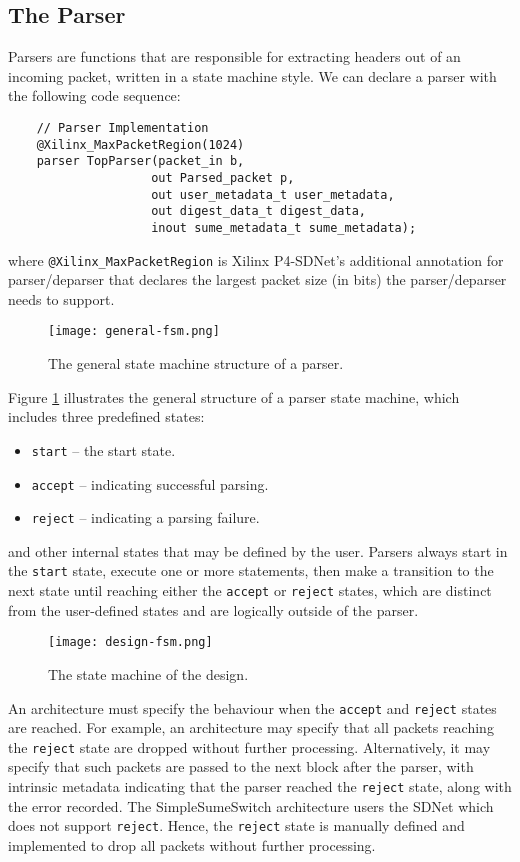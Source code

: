 	\subsection{The Parser}
Parsers are functions that are responsible for extracting headers out of an incoming packet, written in a state machine style. We can declare a parser with the following code sequence:

{\renewcommand{\baselinestretch}{0.8}\small
	\begin{verbatim}
    // Parser Implementation
    @Xilinx_MaxPacketRegion(1024)
    parser TopParser(packet_in b, 
                    out Parsed_packet p, 
                    out user_metadata_t user_metadata,
                    out digest_data_t digest_data,
                    inout sume_metadata_t sume_metadata);
	\end{verbatim}
}
where \texttt{@Xilinx\_MaxPacketRegion} is Xilinx P4-SDNet's additional annotation for parser/deparser that declares the largest packet size (in bits) the parser/deparser needs to support.

\begin{figure}[h]
	\centering
	\texttt{[image: general-fsm.png]}
	\caption{The general state machine structure of a parser.}
	\label{general-fsm}
\end{figure}
 
Figure \ref{general-fsm} illustrates the general structure of a parser state machine, which includes three predefined states: 
\begin{itemize}
	\item \texttt{start} -- the start state.
	\item \texttt{accept} -- indicating successful parsing.
	\item \texttt{reject} -- indicating a parsing failure.
\end{itemize}
and other internal states that may be defined by the user. Parsers always start in the \texttt{start} state, execute one or more statements, then make a transition to the next state until reaching either the \texttt{accept} or \texttt{reject} states, which are distinct from the user-defined states and are logically outside of the parser. 

\begin{figure}[h]
	\centering
	\texttt{[image: design-fsm.png]}
	\caption{The state machine of the design.}
	\label{design-fsm}
\end{figure}

An architecture must specify the behaviour when the \texttt{accept} and \texttt{reject} states are reached. For example, an architecture may specify that all packets reaching the \texttt{reject} state are dropped without further processing. Alternatively, it may specify that such packets are passed to the next block after the parser, with intrinsic metadata indicating that the parser reached the \texttt{reject} state, along with the error recorded. The SimpleSumeSwitch architecture users the SDNet which does not support \texttt{reject}. Hence, the \texttt{reject} state is manually defined and implemented to drop all packets without further processing.

